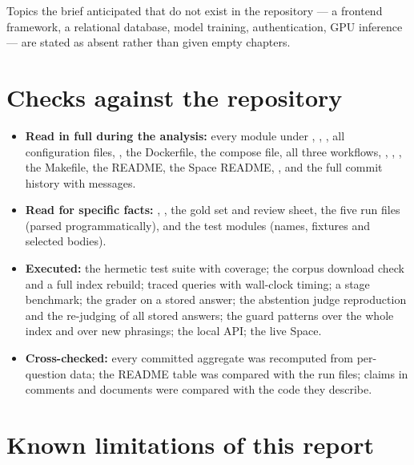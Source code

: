 Topics the brief anticipated that do not exist in the repository --- a frontend framework, a relational database, model training, authentication, GPU inference --- are stated as absent rather than given empty chapters.

\section{Checks against the repository}

\begin{itemize}
  \item \textbf{Read in full during the analysis:} every module under , , , all configuration files, , the Dockerfile, the compose file, all three workflows, , , , the Makefile, the README, the Space README, , and the full commit history with messages.
  \item \textbf{Read for specific facts:} , , the gold set and review sheet, the five run files (parsed programmatically), and the test modules (names, fixtures and selected bodies).
  \item \textbf{Executed:} the hermetic test suite with coverage; the corpus download check and a full index rebuild; traced  queries with wall-clock timing; a stage benchmark; the grader on a stored answer; the abstention judge reproduction and the re-judging of all stored answers; the guard patterns over the whole index and over new phrasings; the local API; the live Space.
  \item \textbf{Cross-checked:} every committed aggregate was recomputed from per-question data; the README table was compared with the run files; claims in comments and documents were compared with the code they describe.
\end{itemize}

\section{Known limitations of this report}


